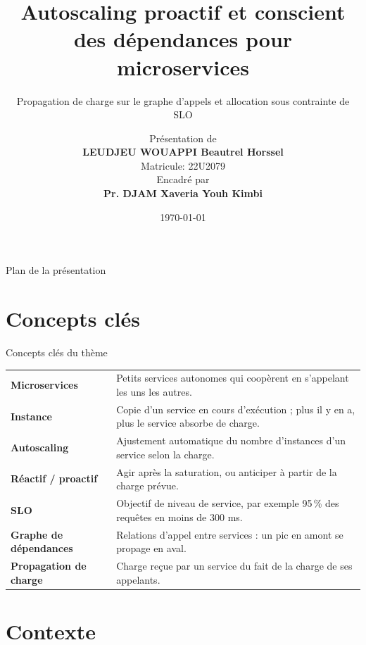 \documentclass[aspectratio=169,10pt]{beamer}
\title[Autoscaling proactif]{Autoscaling proactif et conscient des dépendances pour microservices}
\subtitle{Propagation de charge sur le graphe d'appels et allocation sous contrainte de SLO}
\author[LEUDJEU WOUAPPI 22U2079]{Présentation de\\\textbf{LEUDJEU WOUAPPI Beautrel Horssel}\\Matricule: 22U2079\\\vspace{0.2cm}Encadré par \\\textbf{Pr. DJAM Xaveria Youh Kimbi}}
\institute[Univ. Yaoundé I]{Université de Yaoundé I\\Faculté des Sciences\\Département d'Informatique}
\date{\today}
\begin{document}
\begin{frame}[plain]
  \titlepage
\end{frame}

\begin{frame}{Plan de la présentation}
  \tableofcontents
\end{frame}

\section{Concepts clés}

\begin{frame}{Concepts clés du thème}
  \small
  \begin{tabular}{@{}>{\raggedright\arraybackslash}p{3.6cm}>{\raggedright\arraybackslash}p{9.6cm}@{}}
    \textbf{Microservices} & Petits services autonomes qui coopèrent en s'appelant les uns les autres. \\[6pt]
    \textbf{Instance} & Copie d'un service en cours d'exécution ; plus il y en a, plus le service absorbe de charge. \\[6pt]
    \textbf{Autoscaling} & Ajustement automatique du nombre d'instances d'un service selon la charge. \\[6pt]
    \textbf{Réactif / proactif} & Agir après la saturation, ou anticiper à partir de la charge prévue. \\[6pt]
    \textbf{SLO} & Objectif de niveau de service, par exemple 95\,\% des requêtes en moins de 300 ms. \\[6pt]
    \textbf{Graphe de dépendances} & Relations d'appel entre services : un pic en amont se propage en aval. \\[6pt]
    \textbf{Propagation de charge} & Charge reçue par un service du fait de la charge de ses appelants. \\
  \end{tabular}
\end{frame}

\section{Contexte}
\end{document}
